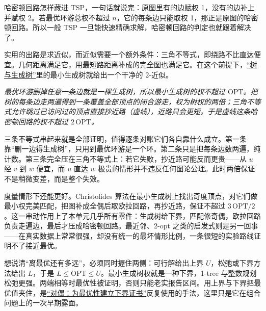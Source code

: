 哈密顿回路怎样藏进 TSP，一句话就说完：原图里有的边赋权 1，没有的边补上并赋权 2。若最优环游总权不超过 \(n\)，它的每条边只能取权 1，那正是原图的哈密顿回路。所以一般 TSP 一旦能快速精确求解，哈密顿回路的判定也就跟着解决了。

实用的出路是求近似，而近似需要一个额外条件：三角不等式，即绕路不比直达便宜。几何距离满足它，用最短路距离补成的完全图也满足它。在这个前提下，\hyperref[sec:04-Discrete-Mathematics/03-Graph-Theory/03]{``树与生成树''}里的最小生成树就给出一个干净的 2-近似。

\begin{center}

\emph{最优环游删掉任意一条边就是一棵生成树，所以最小生成树的权不超过 \(\mathrm{OPT}\)。把树的每条边走两遍得到一条覆盖全部顶点的闭合游走，权为树权的两倍；三角不等式允许跳过已访问过的顶点直接抄近路（虚线），近路只会更短。于是虚线这条哈密顿回路的权不超过 \(2\,\mathrm{OPT}\)。}
\end{center}

三条不等式串起来就是全部证明，值得逐条对账它们各自靠什么成立。第一条靠``删一边得生成树''，只用到最优环游是一个环。第二条只是把每条边数两遍，纯计数。第三条完全压在三角不等式上：若它失败，抄近路可能反而更贵——从 \(u\) 经 \(v\) 到 \(w\) 便宜，而 \(u\) 直达 \(w\) 极贵的情形并不违反任何图论公理。此时两倍保证不是稍微变差，而是整个失效。

度量情形下还能更好。Christofides 算法在最小生成树上找出奇度顶点，对它们做最小权完美匹配，把图补成全偶后取欧拉回路，再抄近路，保证不超过 \(3\,\mathrm{OPT}/2\)。这一串动作用上了本单元几乎所有零件：生成树给下界，匹配修奇偶，欧拉回路负责走遍边，最后才压成哈密顿回路。最近邻、2-opt 之类的启发式则是另一回事——在真实数据上常常很强，却没有统一的最坏情形比例，一条很短的实验路线证明不了接近最优。

想说清``离最优还有多远''，必须同时握住两侧：可行解给出上界 \(U\)，松弛或下界方法给出 \(L\)，于是 \(L\le\mathrm{OPT}\le U\)。最小生成树权就是一种下界，1-tree 与整数规划松弛更强。两端相等时最优性被证明，否则只能老实报告区间。用上界与下界把最优值夹住，是\hyperref[ch:075]{``对偶：为最优性建立下界证书''}反复使用的手法，这里只是它在组合问题上的一次早期露面。

